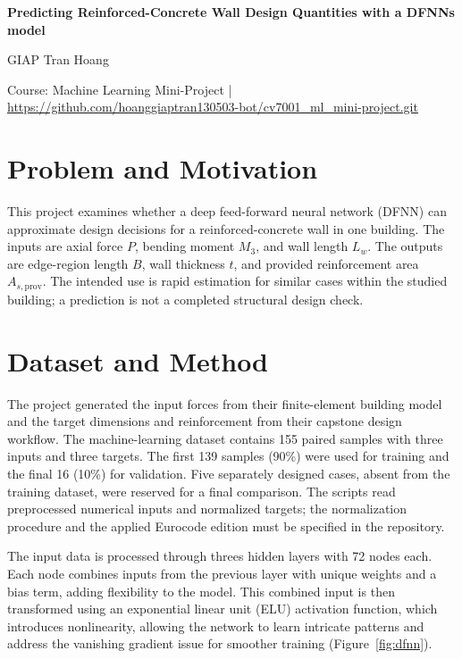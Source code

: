 \documentclass[10pt,a4paper]{article}
\newcommand{\reportauthors}{GIAP Tran Hoang}
\newcommand{\reportrepo}{\url{https://github.com/hoanggiaptran130503-bot/cv7001_ml_mini-project.git}}
\begin{document}
\begin{center}
{\Large\bfseries Predicting Reinforced-Concrete Wall Design Quantities with a DFNNs model\par}
\vspace{5pt}
{\normalsize \reportauthors\par}
\vspace{2pt}
{\small Course: Machine Learning Mini-Project \quad | \quad \reportrepo\par}
\end{center}
\vspace{-6pt}

\section{Problem and Motivation}
This project examines whether a deep feed-forward neural network (DFNN) can
approximate design decisions for a reinforced-concrete wall in one building.
The inputs are axial force $P$, bending moment $M_3$, and wall length $L_w$.
The outputs are edge-region length $B$, wall thickness $t$, and provided
reinforcement area $A_{s,\mathrm{prov}}$. The intended use is rapid estimation
for similar cases within the studied building; a prediction is not a completed
structural design check.

\section{Dataset and Method}
The project generated the input forces from their finite-element building
model and the target dimensions and reinforcement from their capstone design
workflow. The machine-learning dataset contains 155 paired samples with three
inputs and three targets. The first 139 samples (90\%) were used for training
and the final 16 (10\%) for validation. Five separately designed cases, absent
from the training dataset, were reserved for a final comparison. The scripts
read preprocessed numerical inputs and normalized targets; the normalization
procedure and the applied Eurocode edition must be specified in the repository.

The input data is processed through threes hidden layers with 72 nodes each. Each node combines inputs from the previous layer with unique weights and a bias term, adding flexibility to the model. This combined input is then transformed using an exponential linear unit (ELU) activation function, which introduces nonlinearity, allowing the network to learn intricate patterns and address the vanishing gradient issue for smoother training (Figure~\ref{fig:dfnn}).
\end{document}
